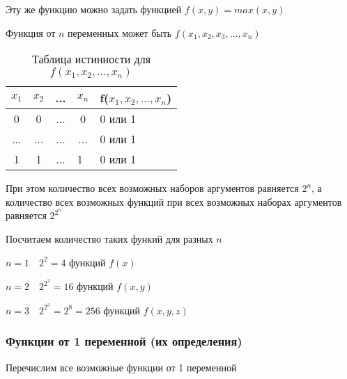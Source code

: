 \documentclass[russian]{lecture-notes}
\begin{document}
\begin{sloppypar}
\begin{example}
            Эту же функцию можно задать функцией $f(x,y) = max(x,y)$
        \end{example}

        \begin{proposition}
            Функция от $n$ переменных может быть $f(x_1, x_2, x_3, \dots, x_n)$

            \begin{table}[h!]
                \centering
                \begin{tabular}{|c|c|c|c|l|}
                    \hline
                    $x_1$ & $x_2$ & ... & $x_n$                  & f($x_1, x_2, \dots, x_n$) \\ \hline
                    0        & 0     & ... & 0                      & 0 или 1                   \\ \hline
                    ...      & ...   & ... & ...                    & 0 или 1                   \\ \hline
                    1        & 1     & ... & \multicolumn{1}{l|}{1} & 0 или 1                   \\ \hline
                \end{tabular}
                \caption{Таблица истинности для $f(x_1,x_2, \dots, x_n)$}
            \end{table}

            При этом количество всех возможных наборов аргументов равняется $2^n$, а количество всех возможных функций при всех возможных наборах аргументов равняется $2^{2^n}$
        \end{proposition}

        \begin{corollary}
            Посчитаем количество таких функий для разных $n$

            $n = 1 \quad 2^2 = 4$ функций $f(x)$

            $n = 2 \quad 2^{2^2} = 16$ функций $f(x,y)$

            $n = 3 \quad 2^{2^3} = 2^8 = 256$ функций $f(x,y,z)$
        \end{corollary}

        \subsubsection{Функции от 1 переменной (их определения)}

        \begin{example}
            Перечислим все возможные функции от 1 переменной


\end{example}
\end{sloppypar}
\end{document}
